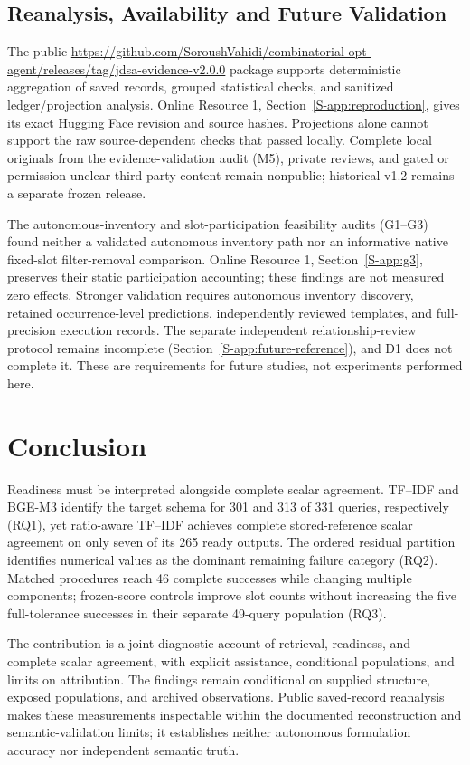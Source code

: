 \documentclass[pdflatex,iicol,sn-basic,Numbered]{sn-jnl}
\begin{document}
\subsection{Reanalysis, Availability and Future Validation}
\label{subsec:reanalysis}\label{subsec:future_work}\label{subsec:closed-audits}
The public \url{https://github.com/SoroushVahidi/combinatorial-opt-agent/releases/tag/jdsa-evidence-v2.0.0} package supports deterministic aggregation of saved records, grouped statistical checks, and sanitized ledger/projection analysis. Online Resource 1, Section~\ref{S-app:reproduction}, gives its exact Hugging Face revision and source hashes. Projections alone cannot support the raw source-dependent checks that passed locally. Complete local originals from the evidence-validation audit (M5), private reviews, and gated or permission-unclear third-party content remain nonpublic; historical v1.2 remains a separate frozen release.

The autonomous-inventory and slot-participation feasibility audits (G1--G3) found neither a validated autonomous inventory path nor an informative native fixed-slot filter-removal comparison. Online Resource 1, Section~\ref{S-app:g3}, preserves their static participation accounting; these findings are not measured zero effects. Stronger validation requires autonomous inventory discovery, retained occurrence-level predictions, independently reviewed templates, and full-precision execution records. The separate independent relationship-review protocol remains incomplete (Section~\ref{S-app:future-reference}), and D1 does not complete it. These are requirements for future studies, not experiments performed here.

\section{Conclusion}
\label{sec:conclusion}
Readiness must be interpreted alongside complete scalar agreement. TF--IDF and BGE-M3 identify the target schema for 301 and 313 of 331 queries, respectively (RQ1), yet ratio-aware TF--IDF achieves complete stored-reference scalar agreement on only seven of its 265 ready outputs. The ordered residual partition identifies numerical values as the dominant remaining failure category (RQ2). Matched procedures reach 46 complete successes while changing multiple components; frozen-score controls improve slot counts without increasing the five full-tolerance successes in their separate 49-query population (RQ3).

The contribution is a joint diagnostic account of retrieval, readiness, and complete scalar agreement, with explicit assistance, conditional populations, and limits on attribution. The findings remain conditional on supplied structure, exposed populations, and archived observations. Public saved-record reanalysis makes these measurements inspectable within the documented reconstruction and semantic-validation limits; it establishes neither autonomous formulation accuracy nor independent semantic truth.
\backmatter
\end{document}
